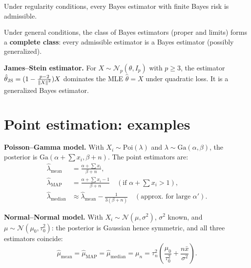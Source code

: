 \begin{theorem}
Under regularity conditions, every Bayes estimator with finite Bayes
risk is admissible.
\end{theorem}

\begin{theorem}
Under general conditions, the class of Bayes estimators (proper and
limits) forms a \textbf{complete class}: every admissible estimator is
a Bayes estimator (possibly generalized).
\end{theorem}

\begin{example}
\textbf{James--Stein estimator.} For $X \sim \mathcal{N}_p(\theta, I_p)$
with $p \geq 3$, the estimator
$\hat{\theta}_{\text{JS}} = (1 - \frac{p-2}{\left\| X \right\|^2})X$ dominates
the MLE $\hat{\theta} = X$ under quadratic loss. It is a generalized
Bayes estimator.
\end{example}

\section{Point estimation: examples}

\begin{example}
\textbf{Poisson--Gamma model.}
With $X_i \sim \text{Poi}(\lambda)$ and $\lambda \sim \text{Ga}(\alpha, \beta)$,
the posterior is $\text{Ga}(\alpha + \sum x_i, \beta + n)$. The point
estimators are:
\begin{align*}
  \hat{\lambda}_{\text{mean}} &= \frac{\alpha + \sum x_i}{\beta + n}, \\
  \hat{\lambda}_{\text{MAP}} &= \frac{\alpha + \sum x_i - 1}{\beta + n}
  \quad (\text{if } \alpha + \sum x_i > 1), \\
  \hat{\lambda}_{\text{median}} &\approx \hat{\lambda}_{\text{mean}}
  - \frac{1}{3(\beta + n)} \quad (\text{approx.\ for large } \alpha').
\end{align*}
\end{example}

\begin{example}
\textbf{Normal--Normal model.}
With $X_i \sim \mathcal{N}(\mu, \sigma^2)$, $\sigma^2$ known, and
$\mu \sim \mathcal{N}(\mu_0, \tau_0^2)$: the posterior is Gaussian
hence symmetric, and all three estimators coincide:
\[
  \hat{\mu}_{\text{mean}} = \hat{\mu}_{\text{MAP}} = \hat{\mu}_{\text{median}}
  = \mu_n = \tau_n^2\left(\frac{\mu_0}{\tau_0^2} + \frac{n\bar{x}}{\sigma^2}\right).
\]
\end{example}

